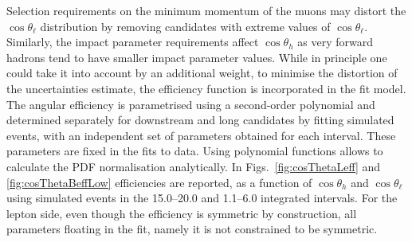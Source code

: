 Selection requirements on the minimum momentum of the muons may distort the $\cos \theta_\ell$ 
distribution by removing candidates with extreme values of $\cos\theta_\ell$. Similarly, 
the impact parameter requirements affect $\cos \theta_h$ as very forward hadrons tend
to have smaller impact parameter values. While in principle one could take it into account
by an additional weight, to minimise the distortion of the uncertainties estimate,
the efficiency function is incorporated in the fit model. The angular efficiency is
parametrised using a second-order polynomial and determined separately for downstream and
long candidates by fitting simulated events, with an independent set of parameters obtained
for each \qsq interval. These parameters are fixed in the fits to data.
Using polynomial functions allows to calculate the PDF normalisation analytically.
In Figs.~\ref{fig:cosThetaLeff} and \ref{fig:cosThetaBeffLow} efficiencies are reported,
as a function of $\cos\theta_h$ and $\cos\theta_\ell$ using \Lb\to\Lz\mumu simulated events
in the 15.0--20.0 and 1.1--6.0 \gevgevcccc integrated \qsq intervals.
%
For the lepton side, even though the efficiency is symmetric by construction,
all parameters floating in the fit, namely it is not constrained to be symmetric.

